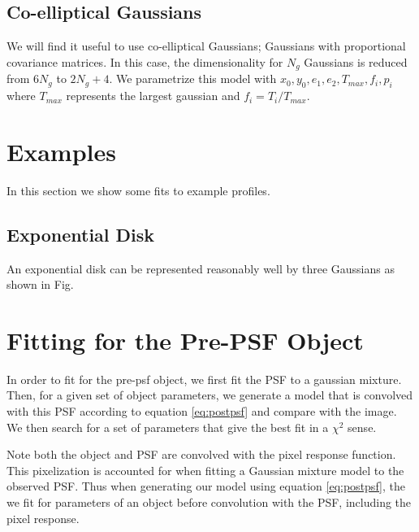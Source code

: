 \documentclass[12pt,preprint]{aastex}
\begin{document}
\subsection{Co-elliptical Gaussians}

We will find it useful to use co-elliptical Gaussians; Gaussians with
proportional covariance matrices.  In this case, the dimensionality for $N_g$
Gaussians is reduced from $6 N_g$ to $2 N_g + 4$.  We parametrize this model
with $x_0, y_0, e_1, e_2, T_{max}, f_{i}, p_{i}$ where $T_{max}$ represents
the largest gaussian and $f_{i} = T_{i}/T_{max}$.


\section{Examples}

In this section we show some fits to example profiles.

\subsection{Exponential Disk}

An exponential disk can be represented reasonably well by three Gaussians
as shown in Fig. 






\section{Fitting for the Pre-PSF Object}

In order to fit for the pre-psf object, we first fit the PSF to a gaussian
mixture.  Then, for a given set of object parameters, we generate a model that
is convolved with this PSF according to equation \ref{eq:postpsf} and compare
with the image.  We then search for a set of parameters that give the best fit
in a $\chi^2$ sense.  

Note both the object and PSF are convolved with the pixel response function.
This pixelization is accounted for when fitting a Gaussian mixture model to the
observed PSF.  Thus when generating our model using equation \ref{eq:postpsf},
the we fit for parameters of an object before convolution with the PSF,
including the pixel response.
\end{document}
